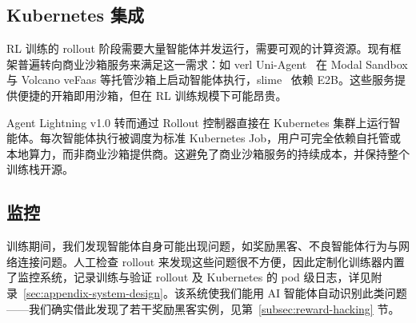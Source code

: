 \subsection{Kubernetes 集成}

RL 训练的 rollout 阶段需要大量智能体并发运行，需要可观的计算资源。现有\add{\harl{}}框架普遍转向商业沙箱服务来满足这一需求：如 verl Uni-Agent~\cite{uniagent} 在 Modal Sandbox 与 Volcano veFaas 等托管沙箱上启动智能体执行，slime~\cite{slime} 依赖 E2B。这些服务提供便捷的开箱即用沙箱，但在 RL 训练规模下可能昂贵。

Agent Lightning v1.0 转而通过 Rollout 控制器直接在 Kubernetes 集群上运行智能体。每次智能体执行被调度为标准 Kubernetes Job，用户可完全依赖自托管或本地算力，而非商业沙箱提供商。这避免了商业沙箱服务的持续成本，并保持整个训练栈开源。

\subsection{监控}

训练期间，我们发现智能体自身可能出现问题，如奖励黑客、不良智能体行为与网络连接问题。人工检查 rollout 来发现这些问题很不方便，因此定制化训练器内置了监控系统，记录训练与验证 rollout 及 Kubernetes 的 pod 级日志，详见附录~\ref{sec:appendix-system-design}。该系统使我们能用 AI 智能体自动识别此类问题——我们确实借此发现了若干奖励黑客实例，见第~\ref{subsec:reward-hacking} 节。
